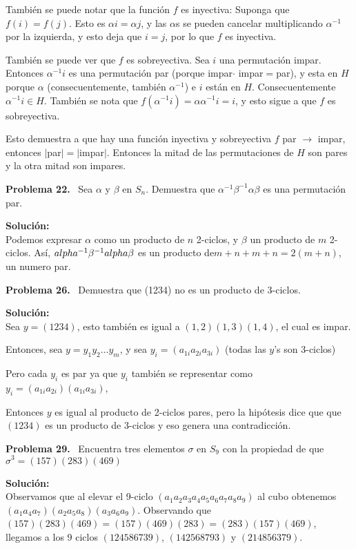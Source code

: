 \documentclass{article}
\newcounter{problem}
\newcounter{solution}
\newcommand\Problem[1]{%
  \stepcounter{problem}%
  \textbf{Problema #1.}~%
  \setcounter{solution}{0}%
}
\newcommand\TheSolution{%
  \textbf{Solución:}\\%
}
\begin{document}
Tambi\'en se puede notar que la funci\'on $f$ es inyectiva: Suponga que
$f(i) = f(j)$. Esto es $\alpha i = \alpha j$, y las $\alpha$s se pueden
cancelar multiplicando $\alpha^{-1}$ por la izquierda, y esto deja que $i=j$,
por lo que $f$ es inyectiva.

También se puede ver que $f$ es sobreyectiva. Sea $i$ una permutación
impar. Entonces $\alpha^{-1}i$ es una permutación par (porque impar$\cdot$
impar$=$par), y esta en $H$ porque $\alpha$ (consecuentemente, también $\alpha
^{-1}$) e $i$ están en $H$. Consecuentemente $\alpha^{-1}i \in H$. También
se nota que $f(\alpha^{-1}i) = \alpha\alpha^{-1}i = i$, y esto sigue a que $f$
es sobreyectiva.

Esto demuestra a que hay una función inyectiva y sobreyectiva $f$ par
$\rightarrow $ impar, entonces $|$par$|=|$impar$|$. Entonces la mitad de las
permutaciones de $H$ son pares y la otra mitad son impares.

\Problem{22} Sea $\alpha$ y $\beta$ en $S_n$. Demuestra que $\alpha^{-1}\beta
^{-1}\alpha\beta$ es una permutación par.

\TheSolution{} Podemos expresar $\alpha$ como un producto de $n$ 2-ciclos, y
$\beta$ un producto de $m$ 2-ciclos. Así, $\\alpha^{-1}\beta^{-1}alpha\beta$
es un producto de$m + n + m + n = 2(m + n)$, un numero par.

\Problem{26} Demuestra que (1234) no es un producto de 3-ciclos.

\TheSolution{}
Sea $y=(1234)$, esto también es igual a $(1,2)(1,3)(1,4)$, el cual es impar.

Entonces, sea $y = y_1y_2\dots y_m$, y sea $y_i = (a_{1i}a_{2i}a_{3i})$ (todas
las $y$'s son 3-ciclos)

Pero cada $y_i$ es par ya que $y_i$ tambi\'en se representar como $y_i = (a_
{1i}a_{2i})(a_{1i}a_{3i})$,

Entonces $y$ es igual al producto de 2-ciclos pares, pero la hip\'otesis dice
que que $(1234)$ es un producto de 3-ciclos y eso genera una contradicci\'on.


\Problem{29} Encuentra tres elementos $\sigma$ en $S_9$ con la propiedad de
que $\sigma^3 = (157)(283)(469)$

\TheSolution{} Observamos que al elevar el 9-ciclo $(a_1 a_2 a_3 a_4 a_5 a_6
a_7 a_8 a_9)$ al cubo obtenemos $(a_1 a_4 a_7)(a_2 a_5 a_8)(a_3 a_6 a_9)$.
Observando que $(157)(283)(469) = (157)(469)(283) = (283)(157)(469)$, llegamos
a los 9 ciclos $(124586739)$, $(142568793)$ y $(214856379)$.
\end{document}
